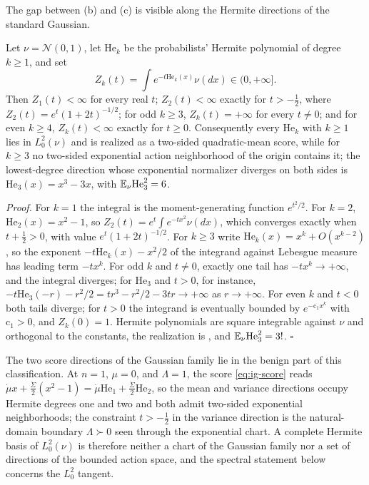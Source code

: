 \medskip
The gap between (b) and (c) is visible along the Hermite directions of the standard
Gaussian.

Let \(\nu=\mathcal N(0,1)\), let \(\mathrm{He}_k\) be the probabilists' Hermite polynomial
of degree \(k\geq1\), and set
\begin{equation}
Z_k(t)=\int e^{-t\mathrm{He}_k(x)}\nu(dx)\in(0,+\infty].
\label{eq:ig-hermite-normalizer}
\end{equation}
Then \(Z_1(t)<\infty\) for every real \(t\); \(Z_2(t)<\infty\) exactly for
\(t>-\tfrac12\), where \(Z_2(t)=e^t(1+2t)^{-1/2}\); for odd \(k\geq3\),
\(Z_k(t)=+\infty\) for every \(t\neq0\); and for even \(k\geq4\),
\(Z_k(t)<\infty\) exactly for \(t\geq0\). Consequently every \(\mathrm{He}_k\) with
\(k\geq1\) lies in \(L^2_0(\nu)\) and is realized as a two-sided quadratic-mean score,
while for \(k\geq3\) no two-sided exponential action neighborhood of the origin contains
it; the lowest-degree direction whose exponential normalizer diverges on both sides is
\(\mathrm{He}_3(x)=x^3-3x\), with \(\mathbb E_\nu\mathrm{He}_3^2=6\). 

\noindent\emph{Proof.}
For \(k=1\) the integral is the moment-generating function \(e^{t^2/2}\). For \(k=2\),
\(\mathrm{He}_2(x)=x^2-1\), so \(Z_2(t)=e^t\int e^{-tx^2}\nu(dx)\), which converges
exactly when \(t+\tfrac12>0\), with value \(e^t(1+2t)^{-1/2}\). For \(k\geq3\) write
\(\mathrm{He}_k(x)=x^k+O(x^{k-2})\), so the exponent \(-t\mathrm{He}_k(x)-x^2/2\) of the
integrand against Lebesgue measure has leading term \(-tx^k\). For odd \(k\) and
\(t\neq0\), exactly one tail has \(-tx^k\to+\infty\), and the integral diverges; for
\(\mathrm{He}_3\) and \(t>0\), for instance, \(-t\mathrm{He}_3(-r)-r^2/2=tr^3-r^2/2-3tr\to+\infty\)
as \(r\to+\infty\). For even \(k\) and \(t<0\) both tails diverge; for \(t>0\) the
integrand is eventually bounded by \(e^{-\mathrm c_1x^k}\) with \(\mathrm c_1>0\), and
\(Z_k(0)=1\). Hermite polynomials are square integrable against \(\nu\) and
orthogonal to the constants, the realization is , and
\(\mathbb E_\nu\mathrm{He}_3^2=3!\). \hfill$\square$

\medskip
The two score directions of the Gaussian family lie in the benign part of this
classification. At \(n=1\), \(\mu=0\), and \(\Lambda=1\), the score \eqref{eq:ig-score}
reads \(\dot\mu x+\tfrac{\dot\Sigma}2(x^2-1)=\dot\mu\mathrm{He}_1+\tfrac{\dot\Sigma}2\mathrm{He}_2\),
so the mean and variance directions occupy Hermite degrees one and two and both admit
two-sided exponential neighborhoods; the constraint \(t>-\tfrac12\) in the variance
direction is the natural-domain boundary \(\Lambda\succ0\) seen through the exponential
chart. A complete Hermite basis of \(L^2_0(\nu)\) is therefore neither a chart of the
Gaussian family nor a set of directions of the bounded action space, and the spectral
statement below concerns the \(L^2_0\) tangent.

